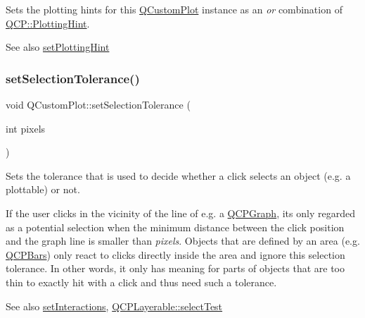 Sets the plotting hints for this \mbox{\hyperlink{class_q_custom_plot}{Q\+Custom\+Plot}} instance as an {\itshape or} combination of \mbox{\hyperlink{namespace_q_c_p_a5400e5fcb9528d92002ddb938c1f4ef4}{Q\+C\+P\+::\+Plotting\+Hint}}.

\begin{DoxySeeAlso}{See also}
\mbox{\hyperlink{class_q_custom_plot_a3b7c97bb6c16464e9e15190c07abe9a9}{set\+Plotting\+Hint}} 
\end{DoxySeeAlso}
\mbox{\label{class_q_custom_plot_a4dc31241d7b09680950e19e5f971ed93}} 
\subsubsection{\texorpdfstring{set\+Selection\+Tolerance()}{setSelectionTolerance()}}
{\footnotesize\ttfamily void Q\+Custom\+Plot\+::set\+Selection\+Tolerance (\begin{DoxyParamCaption}\item[{int}]{pixels }\end{DoxyParamCaption})}

Sets the tolerance that is used to decide whether a click selects an object (e.\+g. a plottable) or not.

If the user clicks in the vicinity of the line of e.\+g. a \mbox{\hyperlink{class_q_c_p_graph}{Q\+C\+P\+Graph}}, it\textquotesingle{}s only regarded as a potential selection when the minimum distance between the click position and the graph line is smaller than {\itshape pixels}. Objects that are defined by an area (e.\+g. \mbox{\hyperlink{class_q_c_p_bars}{Q\+C\+P\+Bars}}) only react to clicks directly inside the area and ignore this selection tolerance. In other words, it only has meaning for parts of objects that are too thin to exactly hit with a click and thus need such a tolerance.

\begin{DoxySeeAlso}{See also}
\mbox{\hyperlink{class_q_custom_plot_a5ee1e2f6ae27419deca53e75907c27e5}{set\+Interactions}}, \mbox{\hyperlink{class_q_c_p_layerable_a04db8351fefd44cfdb77958e75c6288e}{Q\+C\+P\+Layerable\+::select\+Test}} 
\end{DoxySeeAlso}
\mbox{\label{class_q_custom_plot_a3f9bc4b939dd8aaba9339fd09f273fc4}} 
